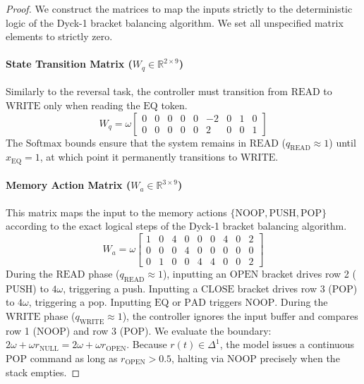 \documentclass[11pt]{article}
\begin{document}
\begin{proof}
We construct the matrices to map the inputs strictly to the deterministic logic of the Dyck-1 bracket balancing algorithm. We set all
unspecified matrix elements to strictly zero.

\paragraph{State Transition Matrix ($W_q \in \mathbb{R}^{2 \times 9}$)}
Similarly to the reversal task, the controller must transition from $\text{READ}$ to $\text{WRITE}$ only when reading the $\text{EQ}$ token. 
\begin{equation}
W_q = \omega \begin{bmatrix}
0 & 0 & 0 & 0 & 0 & -2 & 0 & 1 & 0 \\
0 & 0 & 0 & 0 & 0 & 2 & 0 & 0 & 1
\end{bmatrix}
\end{equation}
The $\text{Softmax}$ bounds ensure that the system remains in $\text{READ}$ ($q_{\text{READ}} \approx 1$) until $x_{\text{EQ}} = 1$, at which point it permanently transitions to $\text{WRITE}$.

\paragraph{Memory Action Matrix ($W_a \in \mathbb{R}^{3 \times 9}$)}
This matrix maps the input to the memory actions $\{\text{NOOP}, \text{PUSH}, \text{POP}\}$ according to the exact logical steps of the Dyck-1 bracket balancing algorithm.
\begin{equation}
W_a = \omega \begin{bmatrix}
1 & 0 & 4 & 0 & 0 & 0 & 4 & 0 & 2 \\
0 & 0 & 0 & 4 & 0 & 0 & 0 & 0 & 0 \\
0 & 1 & 0 & 0 & 4 & 4 & 0 & 0 & 2
\end{bmatrix}
\end{equation}
During the $\text{READ}$ phase ($q_{\text{READ}} \approx 1$), inputting an $\text{OPEN}$ bracket drives row 2 ($\text{PUSH}$) to $4\omega$, triggering a push. Inputting a $\text{CLOSE}$ bracket drives row 3 ($\text{POP}$) to $4\omega$, triggering a pop. Inputting $\text{EQ}$ or $\text{PAD}$ triggers $\text{NOOP}$.
During the $\text{WRITE}$ phase ($q_{\text{WRITE}} \approx 1$), the controller ignores the input buffer and compares row 1 ($\text{NOOP}$) and row 3 ($\text{POP}$). We evaluate the boundary: $2\omega + \omega r_{\text{NULL}} = 2\omega + \omega r_{\text{OPEN}}$. Because $r(t) \in \Delta^1$, the model issues a continuous $\text{POP}$ command as long as $r_{\text{OPEN}} > 0.5$, halting via $\text{NOOP}$ precisely when the stack empties.


\end{proof}
\end{document}
